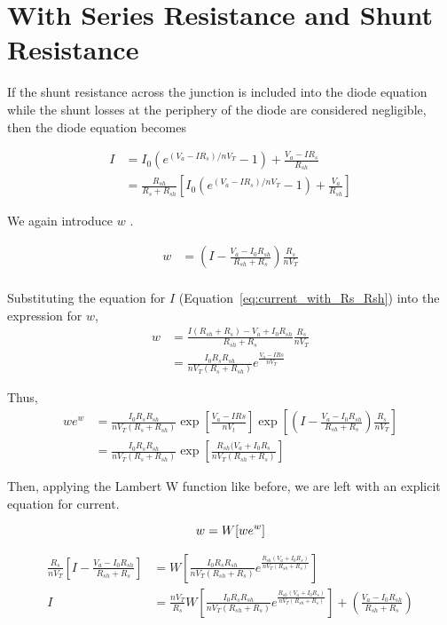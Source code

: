 \documentclass[12pt]{article}
\numberwithin{equation}{section}
\begin{document}
\section{With Series Resistance and Shunt Resistance}

If the shunt resistance across the junction is included into the diode equation while the shunt losses at the periphery of the diode are considered negligible, then the diode equation becomes

\begin{align}
I &=  I_0 (e^{(V_a - I R_s)/n V_T} - 1) + \frac{V_a - I R_s}{R_{sh}} \\
&=  \frac{R_{sh}}{R_s + R_{sh}} \left [ I_0 (e^{(V_a - I R_s)/n V_T} - 1) + \frac{V_a}{R_{sh}} \right ]
\label{eq:current_with_Rs_Rsh}
\end{align}

We again introduce $w$ \cite{Ortiz:00}.

\begin{align}
w &= \left (I - \frac{V_a-I_0R_{sh}}{R_{sh}+R_s} \right )\frac{R_s}{n V_T} \\
\end{align}

Substituting the equation for $I$ (Equation~\ref{eq:current_with_Rs_Rsh}) into the expression for $w$,
\begin{align}
w &=  \frac{ I ( R_{sh} + R_s ) - V_a + I_0 R_{sh}}{R_{sh} + R_s}  \frac{R_s}{n V_T} \\
&= \frac{I_0 R_s R_{sh}}{n V_T (R_s + R_{sh})  } e^{ \frac{V_a - I Rs}{n V_T}}
\end{align}

Thus,
\begin{align}
w e^w &= \frac{I_0 R_s R_{sh}}{n V_T (R_s + R_{sh})  } \exp \left [ \frac{V_a - I Rs}{n V_t} \right ] \exp \left [ \left (I - \frac{V_a-I_0R_{sh}}{R_{sh}+R_s} \right )\frac{R_s}{n V_T} \right ] \\
&= \frac{I_0 R_s R_{sh}}{n V_T (R_s + R_{sh})  } \exp \left [ \frac{R_{sh} (V_a + I_0 R_s}{n V_T (R_{sh} + R_{s} ) } \right ]
\end{align}

Then, applying the Lambert W function like before, we are left with an explicit equation for current.

\begin{equation}
w = W [ w e^w ] \\
\end{equation}

\begin{align}
\frac{R_s}{n V_T} \left [ I - \frac{V_a-I_0 R_{sh}}{R_{sh} + R_s}  \right ]
&= W \left [ \frac{I_0 R_s R_{sh}}{n V_T (R_{sh}+ R_s)}
e^{ \frac{R_{sh}(V_a+I_0 R_s)}{n V_T (R_{sh}+R_s)}} \right ]
  \\
I &= \frac{n V_T}{R_s} W \left [ \frac{I_0  R_s R_{sh}}{n V_T (R_{sh}+ R_s)}
e^{ \frac{R_{sh}(V_a+I_0 R_s)}{n V_T (R_{sh}+R_s)}} \right ] +
\left (\frac{V_a-I_0 R_{sh}}{R_{sh} + R_s} \right )
\end{align}
\end{document}
